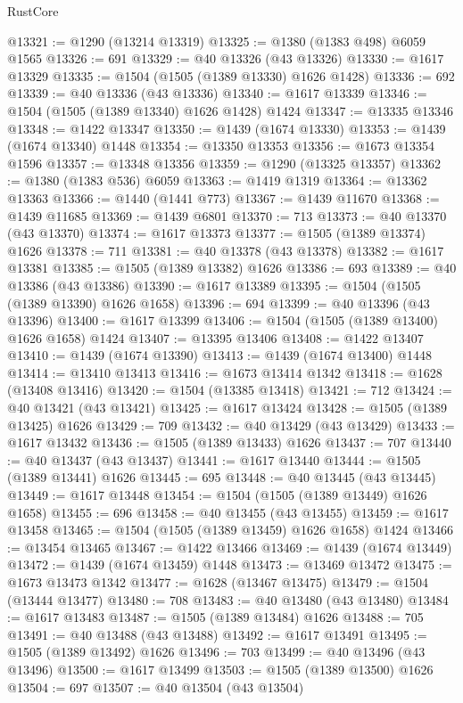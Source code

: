 \begin{lexlean}{RustCore}
\begin{coremodule}
@13321 := @1290 (@13214 @13319)
@13325 := @1380 (@1383 @498) @6059 @1565
@13326 := 691
@13329 := @40 @13326 (@43 @13326)
@13330 := @1617 @13329
@13335 := @1504 (@1505 (@1389 @13330) @1626 @1428)
@13336 := 692
@13339 := @40 @13336 (@43 @13336)
@13340 := @1617 @13339
@13346 := @1504 (@1505 (@1389 @13340) @1626 @1428) @1424
@13347 := @13335 @13346
@13348 := @1422 @13347
@13350 := @1439 (@1674 @13330)
@13353 := @1439 (@1674 @13340) @1448
@13354 := @13350 @13353
@13356 := @1673 @13354 @1596
@13357 := @13348 @13356
@13359 := @1290 (@13325 @13357)
@13362 := @1380 (@1383 @536) @6059
@13363 := @1419 @1319
@13364 := @13362 @13363
@13366 := @1440 (@1441 @773)
@13367 := @1439 @11670
@13368 := @1439 @11685
@13369 := @1439 @6801
@13370 := 713
@13373 := @40 @13370 (@43 @13370)
@13374 := @1617 @13373
@13377 := @1505 (@1389 @13374) @1626
@13378 := 711
@13381 := @40 @13378 (@43 @13378)
@13382 := @1617 @13381
@13385 := @1505 (@1389 @13382) @1626
@13386 := 693
@13389 := @40 @13386 (@43 @13386)
@13390 := @1617 @13389
@13395 := @1504 (@1505 (@1389 @13390) @1626 @1658)
@13396 := 694
@13399 := @40 @13396 (@43 @13396)
@13400 := @1617 @13399
@13406 := @1504 (@1505 (@1389 @13400) @1626 @1658) @1424
@13407 := @13395 @13406
@13408 := @1422 @13407
@13410 := @1439 (@1674 @13390)
@13413 := @1439 (@1674 @13400) @1448
@13414 := @13410 @13413
@13416 := @1673 @13414 @1342
@13418 := @1628 (@13408 @13416)
@13420 := @1504 (@13385 @13418)
@13421 := 712
@13424 := @40 @13421 (@43 @13421)
@13425 := @1617 @13424
@13428 := @1505 (@1389 @13425) @1626
@13429 := 709
@13432 := @40 @13429 (@43 @13429)
@13433 := @1617 @13432
@13436 := @1505 (@1389 @13433) @1626
@13437 := 707
@13440 := @40 @13437 (@43 @13437)
@13441 := @1617 @13440
@13444 := @1505 (@1389 @13441) @1626
@13445 := 695
@13448 := @40 @13445 (@43 @13445)
@13449 := @1617 @13448
@13454 := @1504 (@1505 (@1389 @13449) @1626 @1658)
@13455 := 696
@13458 := @40 @13455 (@43 @13455)
@13459 := @1617 @13458
@13465 := @1504 (@1505 (@1389 @13459) @1626 @1658) @1424
@13466 := @13454 @13465
@13467 := @1422 @13466
@13469 := @1439 (@1674 @13449)
@13472 := @1439 (@1674 @13459) @1448
@13473 := @13469 @13472
@13475 := @1673 @13473 @1342
@13477 := @1628 (@13467 @13475)
@13479 := @1504 (@13444 @13477)
@13480 := 708
@13483 := @40 @13480 (@43 @13480)
@13484 := @1617 @13483
@13487 := @1505 (@1389 @13484) @1626
@13488 := 705
@13491 := @40 @13488 (@43 @13488)
@13492 := @1617 @13491
@13495 := @1505 (@1389 @13492) @1626
@13496 := 703
@13499 := @40 @13496 (@43 @13496)
@13500 := @1617 @13499
@13503 := @1505 (@1389 @13500) @1626
@13504 := 697
@13507 := @40 @13504 (@43 @13504)

\end{coremodule}
\end{lexlean}
